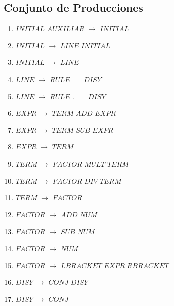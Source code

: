 \noindent



\newpage
\subsection{Conjunto de Producciones}

\begin{enumerate}
\item $INITIAL\_AUXILIAR$ $\rightarrow$ $INITIAL$ \\
\item $INITIAL$   $\rightarrow$  $LINE$ $INITIAL$ \\
\item $INITIAL$   $\rightarrow$  $LINE$ \\
\item $LINE$   $\rightarrow$  $RULE$ $=$ $DISY$ \\
\item $LINE$   $\rightarrow$  $RULE$ $.$ $=$ $DISY$ \\

\item $EXPR$ $\rightarrow$ $TERM$ $ADD$ $EXPR$ \\
\item $EXPR$ $\rightarrow$ $TERM$ $SUB$ $EXPR$ \\
\item $EXPR$ $\rightarrow$ $TERM$ \\

\item $TERM$ $\rightarrow$ $FACTOR$ $MULT$ $TERM$\\
\item $TERM$ $\rightarrow$ $FACTOR$ $DIV$ $TERM$\\
\item $TERM$ $\rightarrow$ $FACTOR$\\

\item $FACTOR$ $\rightarrow$ $ADD$ $NUM$ \\
\item $FACTOR$ $\rightarrow$ $SUB$ $NUM$ \\
\item $FACTOR$ $\rightarrow$ $NUM$ \\
\item $FACTOR$ $\rightarrow$ $LBRACKET$ $EXPR$ $RBRACKET$\\


\item $DISY$   	$\rightarrow$  $CONJ$ \textbar $DISY$ \\
\item $DISY$   	$\rightarrow$  $CONJ$ \\


\end{enumerate}
